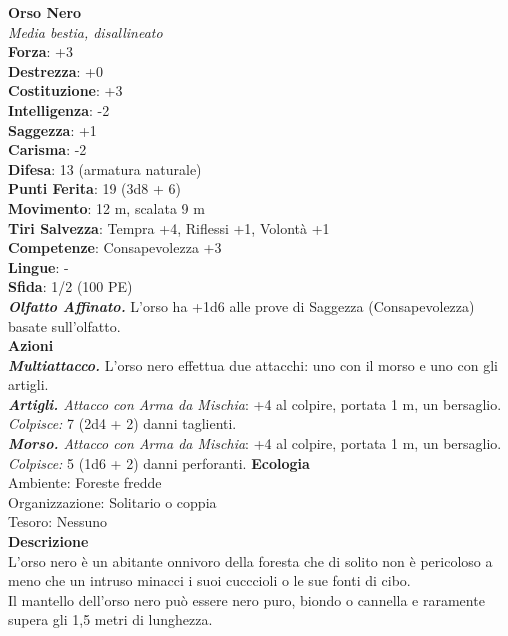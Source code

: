 \begin{multicols}{2}
\medskip\textbf{Orso Nero}\\
\emph{Media bestia, disallineato}\\
\textbf{Forza}: +3\\
\textbf{Destrezza}: +0\\
\textbf{Costituzione}: +3\\
\textbf{Intelligenza}: -2\\
\textbf{Saggezza}: +1\\
\textbf{Carisma}: -2\\
\textbf{Difesa}: 13 (armatura naturale)\\
\textbf{Punti Ferita}: 19 (3d8 + 6)\\
\textbf{Movimento}: 12 m, scalata 9 m\\
\textbf{Tiri Salvezza}: Tempra +4, Riflessi +1, Volontà +1 \\
\textbf{Competenze}: Consapevolezza +3\\
\textbf{Lingue}: -\\
\textbf{Sfida}: 1/2 (100 PE)\smallskip\\
\emph{\textbf{Olfatto Affinato.}} L'orso ha +1d6 alle prove di Saggezza (Consapevolezza) basate sull'olfatto.\\
\smallskip\textbf{Azioni}\\
\emph{\textbf{Multiattacco.}} L'orso nero effettua due attacchi: uno con il morso e uno con gli artigli.\\
\emph{\textbf{Artigli.} Attacco con Arma da Mischia}: +4 al colpire, portata 1 m, un bersaglio.\\
\emph{Colpisce:} 7 (2d4 + 2) danni taglienti.\\
\emph{\textbf{Morso.} Attacco con Arma da Mischia}: +4 al colpire, portata 1 m, un bersaglio.\\
\emph{Colpisce:} 5 (1d6 + 2) danni perforanti.
\textbf{Ecologia}\\
Ambiente: Foreste fredde\\
Organizzazione: Solitario o coppia\\
Tesoro: Nessuno\\
\textbf{Descrizione}\\
L'orso nero è un abitante onnivoro della foresta che di solito non è pericoloso a meno che un intruso minacci i suoi cucccioli o le sue fonti di cibo.\\
Il mantello dell'orso nero può essere nero puro, biondo o cannella e raramente supera gli 1,5 metri di lunghezza. \\



\end{multicols}
